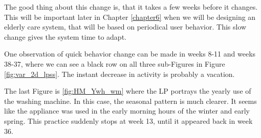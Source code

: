 The good thing about this change is, that it takes a few weeks before it changes. 
This will be important later in Chapter \ref{chapter6} when we will be designing an elderly care system, that will be based on periodical user behavior.
This slow change gives the system time to adapt. 

One observation of quick behavior change can be made in weeks 8-11 and weeks 38-37, where we can see a black row on all three sub-Figures in Figure \ref{fig:var_2d_lpss}.
The instant decrease in activity is probably a vacation.

The last Figure is \ref{fig:HM_Ywh_wm} where the LP portrays the yearly use of the washing machine.
In this case, the seasonal pattern is much clearer. 
It seems like the appliance was used in the early morning hours of the winter and early spring.
This practice suddenly stops at week 13, until it appeared back in week 36.
  
